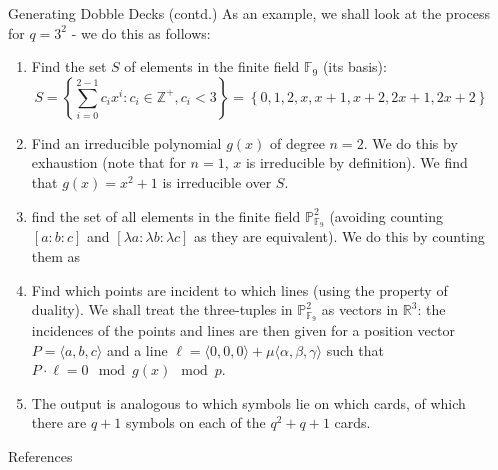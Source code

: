 \documentclass[final]{beamer}
\newlength{\sepwidth}
\newlength{\colwidth}
\newcommand{\separatorcolumn}{\begin{column}{\sepwidth}\end{column}}
\begin{document}
\begin{frame}[t]
\begin{columns}[t]
\begin{column}{\colwidth}
\begin{exampleblock}{Generating Dobble Decks (contd.)}
    As an example, we shall look at the process for $q = 3^2$ - we do this as follows:

    \begin{enumerate}
        \item Find the set $S$ of elements in the finite field $\mathbb{F}_9$ (its basis):
            \begin{equation*}
                S = \left\{ \sum_{i=0}^{2-1} c_ix^i : c_i \in \mathbb{Z}^+, c_i < 3 \right\} = \left\{ 0, 1, 2, x, x+1, x+2, 2x+1, 2x+2 \right\}
            \end{equation*}
        \item Find an irreducible polynomial $g(x)$ of degree $n = 2$. We do this by exhaustion (note that for $n=1$, $x$ is irreducible by definition). We find that $g(x) = x^2+1$ is irreducible over $S$.
        \item find the set of all elements in the finite field $\mathbb{P}^2_{\mathbb{F}_9}$ (avoiding counting $[a:b:c]$ and $[\lambda a:\lambda b:\lambda c]$ as they are equivalent). We do this by counting them as

        \begin{center}
            \begin{minipage}{14em}
                
            \end{minipage}
        \end{center}

        \item Find which points are incident to which lines (using the property of duality). We shall treat the three-tuples in $\mathbb{P}^2_{\mathbb{F}_9}$ as vectors in $\mathbb{R}^3$: the incidences of the points and lines are then given for a position vector $P = \langle a,b,c \rangle$ and a line $\ell = \langle 0,0,0 \rangle + \mu \langle \alpha,\beta,\gamma \rangle$ such that $P \cdot \ell = 0 \mod g(x) \mod p$.

        \item The output is analogous to which symbols lie on which cards, of which there are $q+1$ symbols on each of the $q^2+q+1$ cards.
    \end{enumerate}

  \end{exampleblock}

 
  \begin{block}{References}
    \vspace{-0.25em}
\footnotesize{}
  \end{block}

\end{column}

\separatorcolumn
\end{columns}
\end{frame}
\end{document}
